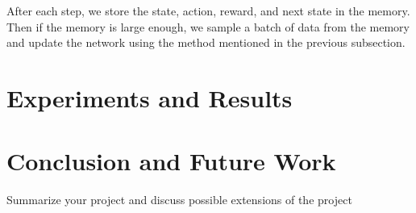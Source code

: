 After each step, we store the state, action, reward, and next state in the memory. Then if the memory is large enough, we sample a batch of data from the memory and update the network using the method mentioned in the previous subsection. 

\section{Experiments and Results}


\section{Conclusion and Future Work}
Summarize your project and discuss possible extensions of the project